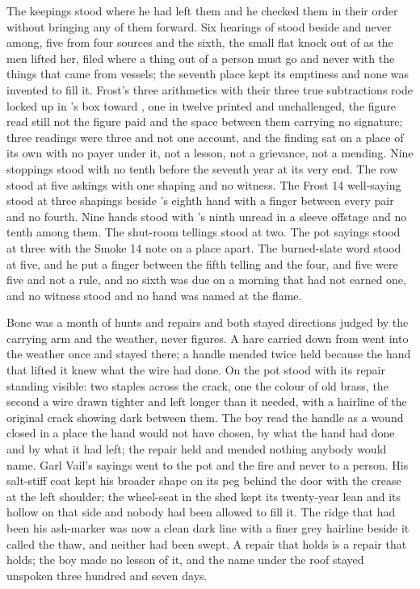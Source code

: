 The keepings stood where he had left them and he checked them in their order without bringing any of them forward. Six hearings of  stood beside and never among, five from four sources and the sixth, the small flat knock out of  as the men lifted her, filed where a thing out of a person must go and never with the things that came from vessels; the seventh place kept its emptiness and none was invented to fill it. Frost's three arithmetics with their three true subtractions rode locked up  in 's box toward , one in twelve printed and unchallenged, the figure read still not the figure paid and the space between them carrying no signature; three readings were three and not one account, and the finding sat on a place of its own with no payer under it, not a lesson, not a grievance, not a mending. Nine stoppings stood with no tenth before the seventh year at its very end. The row stood at five askings with one shaping and no witness. The Frost 14 well-saying stood at three shapings beside 's eighth hand with a finger between every pair and no fourth. Nine hands stood with 's ninth unread in a sleeve offstage and no tenth among them. The shut-room tellings stood at two. The pot sayings stood at three with the Smoke 14 note on a place apart. The burned-slate word stood at five, and he put a finger between the fifth telling and the four, and five were five and not a rule, and no sixth was due on a morning that had not earned one, and no witness stood and no hand was named at the flame.

Bone was a month of hunts and repairs and both stayed directions judged by the carrying arm and the weather, never figures. A hare carried down from  went into the weather once and stayed there; a handle mended twice held because the hand that lifted it knew what the wire had done. On  the pot stood with its repair standing visible: two staples across the crack, one the colour of old brass, the second a wire drawn tighter and left longer than it needed, with a hairline of the original crack showing dark between them. The boy read the handle as a wound closed in a place the hand would not have chosen, by what the hand had done and by what it had left; the repair held and mended nothing anybody would name. Garl Vail's sayings went to the pot and the fire and never to a person. His salt-stiff coat kept his broader shape on its peg behind the door with the crease at the left shoulder; the wheel-seat in the shed kept its twenty-year lean and its hollow on that side and nobody had been allowed to fill it. The ridge that had been his ash-marker was now a clean dark line with a finer grey hairline beside it called the thaw, and neither had been swept. A repair that holds is a repair that holds; the boy made no lesson of it, and the name under the roof stayed unspoken three hundred and seven days.

